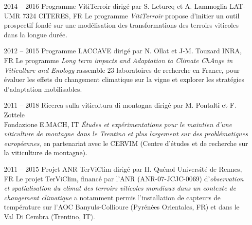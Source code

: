 \documentclass[]{cv-etienne}
\begin{document}
\begin{entrylist}
\entry
{2014 -- 2016}
{Programme VitiTerroir {\normalfont dirigé par S. Leturcq et A. Lammoglia}}
{LAT-UMR 7324 CITERES, FR}
{Le programme \emph{VitiTerroir} propose d'initier un outil prospectif fondé sur une modélisation des transformations des terroirs viticoles dans la longue durée.}
\end{entrylist}
\begin{entrylist}
\entry
{2012 -- 2015}
{Programme LACCAVE {\normalfont dirigé par N. Ollat et J-M. Touzard}}
{INRA, FR}
{Le programme \emph{Long term impacts and Adaptation to Climate ChAnge in Viticulture and Enology} rassemble 23 laboratoires de recherche en France, pour évaluer les effets du changement climatique sur la vigne et explorer les stratégies d'adaptation mobilisables.}
\end{entrylist}
\begin{entrylist}
\entry
{2011 -- 2018}
{Ricerca sulla viticoltura di montagna  {\normalfont  dirigé par M. Pontalti et F. Zottele \\}}
{ Fondazione E.MACH, IT}
{\emph{Études et expérimentations pour le maintien d'une viticulture de montagne dans le Trentino et plus largement sur des problématiques européennes}, en partenariat avec le CERVIM  (Centre d'études et de recherche sur la viticulture de montagne).}
\end{entrylist}
\begin{entrylist}
\entry
{2011 -- 2015}
{Projet ANR TerViClim {\normalfont dirigé par H. Quénol}}
{ Université de Rennes, FR}
{Le projet TerViClim, financé par l'ANR (ANR-07-JCJC-0069) d'\emph{observation et spatialisation du climat des terroirs viticoles mondiaux dans un contexte de changement climatique} a notamment permis l'installation de capteurs de température sur l'AOC Banyuls-Collioure (Pyrénées Orientales, FR) et dans le Val Di Cembra (Trentino, IT).}
\end{entrylist}
\end{document}
